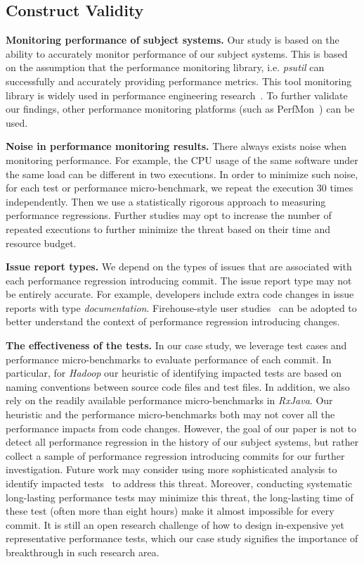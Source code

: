 \subsection{Construct Validity}


\textbf{Monitoring performance of subject systems.} Our study is based on the ability to accurately monitor performance of our subject systems. This is based on the assumption that the performance monitoring library, i.e. \emph{psutil} can successfully and accurately providing performance metrics. This tool monitoring library is widely used in performance engineering research~\cite{peterfse,tarekmsr16}. To further validate our findings, other performance monitoring platforms (such as PerfMon~\cite{perfmon}) can be used. 

\textbf{Noise in performance monitoring results.} There always exists noise when monitoring performance\cite{asplos2012noiseinperf}. For example, the CPU usage of the same software under the same load can be different in two executions. In order to minimize such noise, for each test or performance micro-benchmark, we repeat the execution 30 times independently. Then we use a statistically rigorous approach to measuring performance regressions. Further studies may opt to increase the number of repeated executions to further minimize the threat based on their time and resource budget.

\textbf{Issue report types. }We depend on the types of issues that are associated with each performance regression introducing commit. The issue report type may not be entirely accurate. For example, developers include extra code changes in issue reports with type \emph{documentation}. Firehouse-style user studies~\cite{thomasfritzfirehouse} can be adopted to better understand the context of performance regression introducing changes. 

\textbf{The effectiveness of the tests.} In our case study, we leverage test cases and performance micro-benchmarks to evaluate performance of each commit. In particular, for \emph{Hadoop} our heuristic of identifying impacted tests are based on naming conventions between source code files and test files. In addition, we also rely on the readily available performance micro-benchmarks in \emph{RxJava}. Our heuristic and the performance micro-benchmarks both may not cover all the performance impacts from code changes. However, the goal of our paper is not to detect all performance regression in the history of our subject systems, but rather collect a sample of performance regression introducing commits for our further investigation. Future work may consider using more sophisticated analysis to identify impacted tests~\cite{Qusef:2014:RTT:2565887.2566083} to address this threat. Moreover, conducting systematic long-lasting performance tests may minimize this threat, the long-lasting time of these test (often more than eight hours) make it almost impossible for every commit. It is still an open research challenge of how to design in-expensive yet representative performance tests, which our case study signifies the importance of breakthrough in such research area. 


